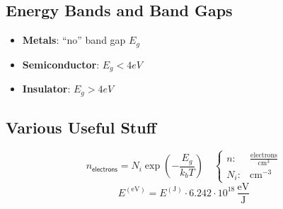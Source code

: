 \subsection{Energy Bands and Band Gaps}
\begin{itemize}
    \item \textbf{Metals}: ``no'' band gap $E_g$
    \item \textbf{Semiconductor}: $E_g < 4eV$
    \item \textbf{Insulator}: $E_g > 4eV$
\end{itemize}

\subsection{Various Useful Stuff}
\noindent\begin{equation*}
    n_{\mathsf{electrons}} = N_i \exp\left(-\frac{E_g}{k_b T}\right)\quad \begin{cases}
        n:   & \mathrm{\frac{electrons}{cm^3}} \\
        N_i: & \mathrm{cm^{-3}}
    \end{cases}
\end{equation*}
\noindent\begin{equation*}
    E^{(\mathrm{eV})} = E^{(\mathrm{J})} \cdot 6.242 \cdot 10^{18}\, \mathrm{\frac{eV}{J}}
\end{equation*}